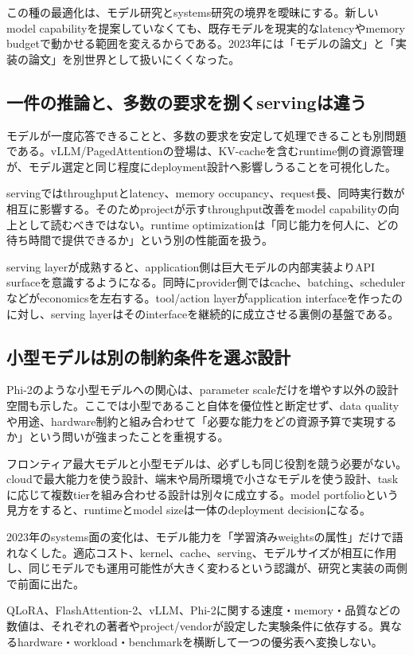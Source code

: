 この種の最適化は、モデル研究とsystems研究の境界を曖昧にする。新しいmodel capabilityを提案していなくても、既存モデルを現実的なlatencyやmemory budgetで動かせる範囲を変えるからである。2023年には「モデルの論文」と「実装の論文」を別世界として扱いにくくなった。\autocite{src-5e1a3a4fc45b}


\subsection{一件の推論と、多数の要求を捌くservingは違う}

モデルが一度応答できることと、多数の要求を安定して処理できることも別問題である。vLLM/PagedAttentionの登場は、KV-cacheを含むruntime側の資源管理が、モデル選定と同じ程度にdeployment設計へ影響しうることを可視化した。\autocite{src-1ab9d44a819a,src-e03b0ba5b24e,src-fb804ac849e4}


servingではthroughputとlatency、memory occupancy、request長、同時実行数が相互に影響する。そのためprojectが示すthroughput改善をmodel capabilityの向上として読むべきではない。runtime optimizationは「同じ能力を何人に、どの待ち時間で提供できるか」という別の性能面を扱う。\autocite{src-1ab9d44a819a,src-e03b0ba5b24e,src-fb804ac849e4}


serving layerが成熟すると、application側は巨大モデルの内部実装よりAPI surfaceを意識するようになる。同時にprovider側ではcache、batching、schedulerなどがeconomicsを左右する。tool/action layerがapplication interfaceを作ったのに対し、serving layerはそのinterfaceを継続的に成立させる裏側の基盤である。\autocite{src-1ab9d44a819a,src-e03b0ba5b24e,src-fb804ac849e4}


\subsection{小型モデルは別の制約条件を選ぶ設計}

Phi-2のような小型モデルへの関心は、parameter scaleだけを増やす以外の設計空間も示した。ここでは小型であること自体を優位性と断定せず、data qualityや用途、hardware制約と組み合わせて「必要な能力をどの資源予算で実現するか」という問いが強まったことを重視する。\autocite{src-6e61359d2fae}


フロンティア最大モデルと小型モデルは、必ずしも同じ役割を競う必要がない。cloudで最大能力を使う設計、端末や局所環境で小さなモデルを使う設計、taskに応じて複数tierを組み合わせる設計は別々に成立する。model portfolioという見方をすると、runtimeとmodel sizeは一体のdeployment decisionになる。\autocite{src-6e61359d2fae}


2023年のsystems面の変化は、モデル能力を「学習済みweightsの属性」だけで語れなくした。適応コスト、kernel、cache、serving、モデルサイズが相互に作用し、同じモデルでも運用可能性が大きく変わるという認識が、研究と実装の両側で前面に出た。\autocite{src-1ab9d44a819a,src-5e1a3a4fc45b,src-6e61359d2fae,src-7f830e688335,src-e03b0ba5b24e,src-fb804ac849e4}


\begin{claimboundary}
QLoRA、FlashAttention-2、vLLM、Phi-2に関する速度・memory・品質などの数値は、それぞれの著者やproject/vendorが設定した実験条件に依存する。異なるhardware・workload・benchmarkを横断して一つの優劣表へ変換しない。\autocite{src-1ab9d44a819a,src-5e1a3a4fc45b,src-6e61359d2fae,src-7f830e688335,src-e03b0ba5b24e,src-fb804ac849e4}
\end{claimboundary}
